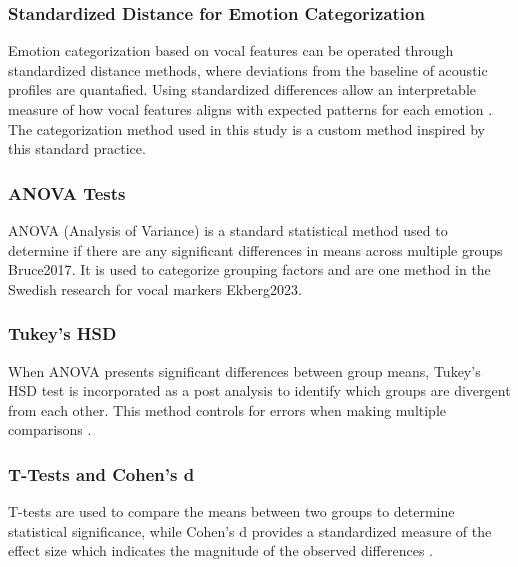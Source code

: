 \subsubsection{Standardized Distance for Emotion Categorization}
Emotion categorization based on vocal features can be operated through standardized distance methods, where deviations from the baseline of acoustic profiles are quantafied. Using standardized differences allow an interpretable measure of how vocal features aligns with expected patterns for each emotion \autocite{Ekberg2023} \autocite{Bruce2017}. 
The categorization method used in this study is a custom method inspired by this standard practice. 

\subsubsection{ANOVA Tests}
ANOVA (Analysis of Variance) is a standard statistical method used to determine if there are any significant differences in means across multiple groups {Bruce2017}. It is used to categorize grouping factors and are one method in the Swedish research for vocal markers {Ekberg2023}.  

\subsubsection{Tukey's HSD}
When ANOVA presents significant differences between group means, Tukey's HSD test is incorporated as a post analysis to identify which groups are divergent from each other. 
This method controls for errors when making multiple comparisons \autocite{Bruce2017}. 
\subsubsection{T-Tests and Cohen's d}
T-tests are used to compare the means between two groups to determine statistical significance, while Cohen's d provides a standardized measure of the effect size which indicates the magnitude of the observed differences \autocite{Cohen1977} \autocite{Bruce2017}.
